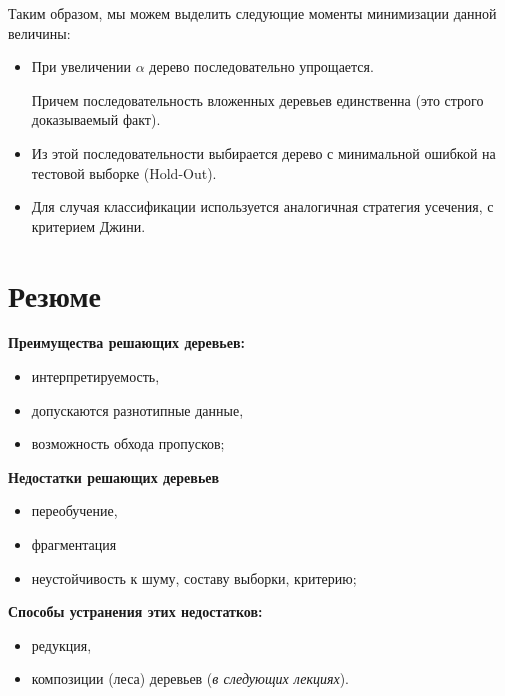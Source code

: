 \documentclass{article}
\begin{document}
Таким образом, мы можем выделить следующие моменты минимизации данной величины:

\begin{itemize}
\item При увеличении $\alpha$ дерево последовательно упрощается.

Причем последовательность вложенных деревьев единственна (это строго доказываемый факт).

\item Из этой последовательности выбирается дерево с минимальной ошибкой на тестовой выборке (Hold-Out).

\item Для случая классификации используется аналогичная стратегия усечения, с критерием Джини.
\end{itemize}

\section{Резюме}

\textbf{Преимущества решающих деревьев:}

\begin{itemize}
\item интерпретируемость,
\item допускаются разнотипные данные,
\item возможность обхода пропусков;
\end{itemize}

\textbf{Недостатки решающих деревьев}

\begin{itemize}
\item переобучение,
\item фрагментация
\item неустойчивость к шуму, составу выборки, критерию;
\end{itemize}

\textbf{Способы устранения этих недостатков:}

\begin{itemize}
\item редукция,
\item композиции (леса) деревьев (\textit{в следующих лекциях}).
\end{itemize}
\end{document}
